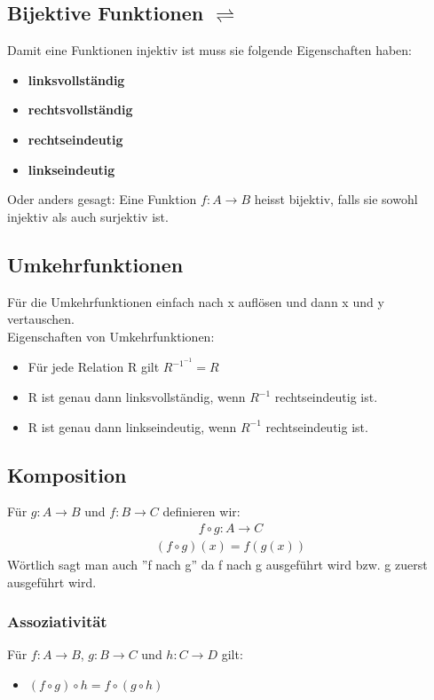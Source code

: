 \subsection{Bijektive Funktionen $\rightleftharpoons$}
Damit eine Funktionen injektiv ist muss sie folgende Eigenschaften haben:
\begin{itemize}
    \item \textbf{linksvollständig}
    \item \textbf{rechtsvollständig}
    \item \textbf{rechtseindeutig}
    \item \textbf{linkseindeutig}  
\end{itemize}
Oder anders gesagt: Eine Funktion $f : A \rightarrow B$ heisst bijektiv, 
falls sie sowohl injektiv als auch surjektiv ist.
\subsection{Umkehrfunktionen}
Für die Umkehrfunktionen einfach nach x auflösen und dann x und y vertauschen.\\
Eigenschaften von Umkehrfunktionen:
\begin{itemize}
    \item Für jede Relation R gilt $R^{-1^{-1}} = R$
    \item R ist genau dann linksvollständig, wenn $R^{-1}$ rechtseindeutig ist.
    \item R ist genau dann linkseindeutig, wenn $R^{-1}$ rechtseindeutig ist.
\end{itemize}
\subsection{Komposition}
Für $g: A \rightarrow B $ und $f: B \rightarrow C$ definieren wir:
\begin{align*}
    f \circ g: A \rightarrow C
\end{align*}
\begin{align*}
    (f \circ g)(x) = f(g(x))
\end{align*}
Wörtlich sagt man auch ''f nach g'' da f nach g ausgeführt wird bzw. g zuerst ausgeführt wird.
\subsubsection{Assoziativität}
Für $f: A \rightarrow B$, $g: B \rightarrow C$ und $h: C \rightarrow D$ gilt:
\begin{itemize}
    \item $(f \circ g) \circ h = f \circ (g \circ h)$
\end{itemize}

